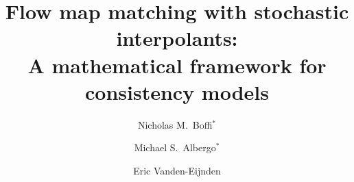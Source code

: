 \documentclass[11pt]{article}
\title{\centering Flow map matching with stochastic interpolants:\\A mathematical framework for consistency models}
\author{Nicholas M.~Boffi$^*$}
\author{Michael S.~Albergo$^*$}
\author{Eric Vanden-Eijnden}
\affil{Courant Institute of Mathematical Sciences}
\begin{document}
\maketitle

\begin{abstract}
	
\end{abstract}











\newpage
\appendix

\end{document}
